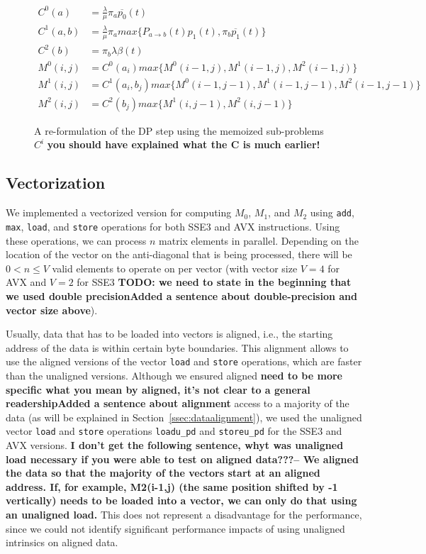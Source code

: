 \documentclass[runningheads,a4paper]{llncs}
\begin{document}
\begin{figure}
\[
\begin{aligned}
  C^0(a)&=\frac{\lambda}{\mu}\pi_{a}\overline{p_0}(t)\\
  C^1(a, b)&=\frac{\lambda}{\mu}\pi_{a}max\{P_{a \rightarrow b}(t) p_1(t), \pi_{b}\overline{p_1}(t)\}\\
  C^2(b)&=\pi_{b}\lambda\beta(t)\\
  M^0(i,j)&=C^0(a_i)max\{M^0(i-1, j), M^1(i-1,j), M^2(i-1,j)\}\\
  M^1(i,j)&=C^1(a_i,b_j)max\{M^0(i-1, j-1), M^1(i-1,j-1), M^2(i-1,j-1)\}\\
  M^2(i,j)&=C^2(b_j)max\{M^1(i,j-1), M^2(i,j-1)\}
\end{aligned}
\]
\caption{A re-formulation of the DP step using the memoized sub-problems $C^i$ {\bf you should have explained what the C is much earlier!}}
\label{fig:memo}
\end{figure}


\subsection{Vectorization}
\label{ssec:vectorization}

We implemented a vectorized version for computing 
$M_0$, $M_1$, and $M_2$ using \texttt{add}, \texttt{max}, \texttt{load}, and \texttt{store}
operations for both SSE3 and AVX instructions.  
Using these operations, we can process $n$ matrix elements in parallel.  
Depending on the location of the vector on the anti-diagonal that is being processed, there will be $0 < n \leq V$ valid elements to operate on 
per vector (with vector size $V = 4$ for AVX and $V = 2$ for SSE3 {\bf TODO: we
need to state in the beginning that we used double precision}{\bf Added a sentence about
double-precision and vector size above}). 

Usually, data that has to be loaded into vectors is aligned, i.e., the starting
address of the data is within certain byte boundaries. This alignment allows to
use the aligned versions of the vector \texttt{load} and \texttt{store} operations,
which are faster than the unaligned versions.
Although we ensured aligned {\bf need to be more specific what you mean by
aligned, it's not clear to a general readership}{\bf Added a sentence about
alignment} 
access to a majority of the data (as will be explained in
Section~\ref{ssec:dataalignment}), we used the unaligned vector \texttt{load} and \texttt{store}
operations \texttt{loadu\_pd} and \texttt{storeu\_pd} for the SSE3 and AVX versions. 
{\bf I don't get the following sentence, whyt was unaligned load necessary if
you were able to test on aligned data???}{\bf -- We aligned the data so that the
  majority of the vectors start at an aligned address. If, for example,
  M2(i-1,j) (the same position shifted by -1 vertically) needs to be loaded into
a vector, we can only do that using an unaligned load.}
  This does not represent a disadvantage for the
performance, since we could not identify significant performance impacts of
using unaligned intrinsics on aligned data.
\end{document}
